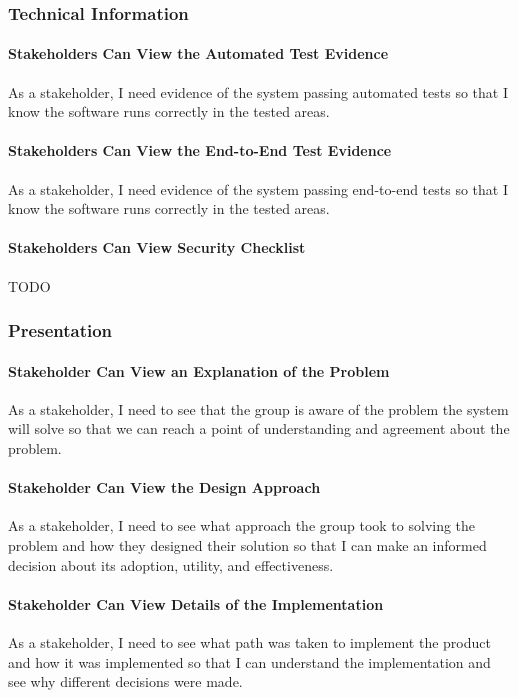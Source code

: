 \subsubsection{Technical Information}

\paragraph{Stakeholders Can View the Automated Test Evidence}
As a stakeholder, I need evidence of the system passing automated tests so that I know the software runs correctly in the tested areas.

\paragraph{Stakeholders Can View the End-to-End Test Evidence}
As a stakeholder, I need evidence of the system passing end-to-end tests so that I know the software runs correctly in the tested areas.

\paragraph{Stakeholders Can View Security Checklist}
TODO

\subsubsection{Presentation}

\paragraph{Stakeholder Can View an Explanation of the Problem}
As a stakeholder, I need to see that the group is aware of the problem the system will solve so that we can reach a point of understanding and agreement about the problem.

\paragraph{Stakeholder Can View the Design Approach}
As a stakeholder, I need to see what approach the group took to solving the problem and how they designed their solution so that I can make an informed decision about its adoption, utility, and effectiveness.

\paragraph{Stakeholder Can View Details of the Implementation}
As a stakeholder, I need to see what path was taken to implement the product and how it was implemented so that I can understand the implementation and see why different decisions were made.

